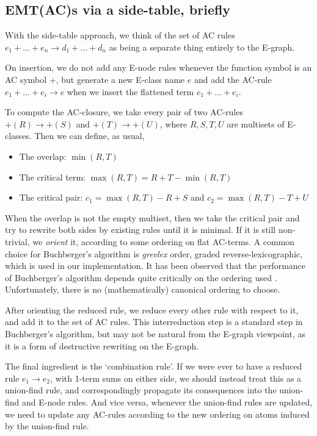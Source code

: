 \documentclass[12pt,a4paper,twoside,openright]{report}
\numberwithin{equation}{chapter}		%
\numberwithin{figure}{chapter}			%
\numberwithin{table}{chapter}			%
\theoremstyle{definition}
\theoremstyle{plain}
\begin{document}
\subsection{EMT(AC)s via a side-table, briefly}
With the side-table approach, we think of the set of AC rules $e_1 + \ldots + e_n \rightarrow d_1 + \ldots + d_n$ as being a separate thing entirely to the E-graph.

On insertion, we do not add any E-node rules whenever the function symbol is an AC symbol +, but generate a new E-class name $e$ and add the AC-rule $e_1 + \ldots + e_i \rightarrow e$ when we insert the flattened term $e_1 + \ldots + e_i$.

To compute the AC-closure, we take every pair of two AC-rules $+(R) \rightarrow +(S)$ and $+(T) \rightarrow +(U)$, where $R, S, T, U$ are multisets of E-classes. Then we can define, as usual,
\begin{itemize}
\item The overlap: $\min(R, T)$
\item The critical term: $\max(R, T) = R + T - \min(R, T)$
\item The critical pair: $c_1 = \max(R, T) - R + S$ and $c_2 = \max(R, T) - T + U$
\end{itemize}

When the overlap is not the empty multiset, then we take the critical pair and try to rewrite both sides by existing rules until it is minimal. If it is still non-trivial, we \emph{orient} it, according to some ordering on flat AC-terms. A common choice for Buchberger's algorithm is \emph{grevlex} order, graded reverse-lexicographic, which is used in our implementation. It has been observed that the performance of Buchberger's algorithm depends quite critically on the ordering used \cite[Chapter~2, section~10, subsection \textit{Complexity~issues}]{cox_ideals_2015}. Unfortunately, there is no (mathematically) canonical ordering to choose.

After orienting the reduced rule, we reduce every other rule with respect to it, and add it to the set of AC rules. This interreduction step is a standard step in Buchberger's algorithm, but may not be natural from the E-graph viewpoint, as it is a form of destructive rewriting on the E-graph.

The final ingredient is the `combination rule'. If we were ever to have a reduced rule $e_1 \rightarrow e_2$, with 1-term sums on either side, we should instead treat this as a union-find rule, and correspondingly propagate its consequences into the union-find and E-node rules. And vice versa, whenever the union-find rules are updated, we need to update any AC-rules according to the new ordering on atoms induced by the union-find rule.
\end{document}
